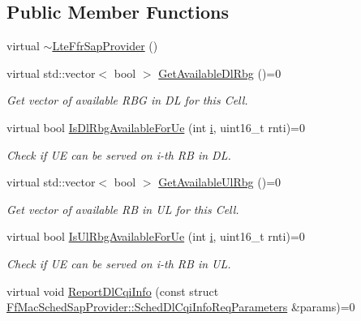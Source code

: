\subsection*{Public Member Functions}
\begin{DoxyCompactItemize}
\item 
virtual \hyperlink{classns3_1_1LteFfrSapProvider_a96e69749f215acf8d03c6eb2a77f10c4}{$\sim$\+Lte\+Ffr\+Sap\+Provider} ()
\item 
virtual std\+::vector$<$ bool $>$ \hyperlink{classns3_1_1LteFfrSapProvider_ad60306dae43b74dc25b65f81d6587a24}{Get\+Available\+Dl\+Rbg} ()=0
\begin{DoxyCompactList}\small\item\em Get vector of available R\+BG in DL for this Cell. \end{DoxyCompactList}\item 
virtual bool \hyperlink{classns3_1_1LteFfrSapProvider_a91f4de3c794d2a32fae5bcfafd88b6fa}{Is\+Dl\+Rbg\+Available\+For\+Ue} (int \hyperlink{lte__uplink__power__control_8m_a6f6ccfcf58b31cb6412107d9d5281426}{i}, uint16\+\_\+t rnti)=0
\begin{DoxyCompactList}\small\item\em Check if UE can be served on i-\/th RB in DL. \end{DoxyCompactList}\item 
virtual std\+::vector$<$ bool $>$ \hyperlink{classns3_1_1LteFfrSapProvider_aafd23b22a27ec83e03d54795c122d175}{Get\+Available\+Ul\+Rbg} ()=0
\begin{DoxyCompactList}\small\item\em Get vector of available RB in UL for this Cell. \end{DoxyCompactList}\item 
virtual bool \hyperlink{classns3_1_1LteFfrSapProvider_a3ef80840549b8ea3d50d2cef8a9866e2}{Is\+Ul\+Rbg\+Available\+For\+Ue} (int \hyperlink{lte__uplink__power__control_8m_a6f6ccfcf58b31cb6412107d9d5281426}{i}, uint16\+\_\+t rnti)=0
\begin{DoxyCompactList}\small\item\em Check if UE can be served on i-\/th RB in UL. \end{DoxyCompactList}\item 
virtual void \hyperlink{classns3_1_1LteFfrSapProvider_a9b28572b241707f364405a269f79dbd8}{Report\+Dl\+Cqi\+Info} (const struct \hyperlink{structns3_1_1FfMacSchedSapProvider_1_1SchedDlCqiInfoReqParameters}{Ff\+Mac\+Sched\+Sap\+Provider\+::\+Sched\+Dl\+Cqi\+Info\+Req\+Parameters} \&params)=0

\end{DoxyCompactItemize}
